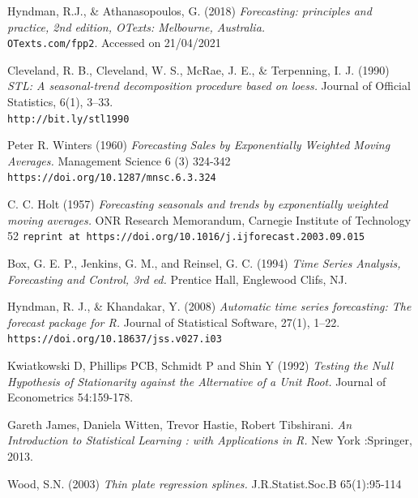 \documentclass[12pt, letterpaper]{article}\usepackage[]{graphicx}\usepackage[]{color}
\begin{document}
\begin{thebibliography}{9}
Hyndman, R.J., \& Athanasopoulos, G. (2018) 
\textit{Forecasting: principles and practice, 2nd edition, OTexts: Melbourne, Australia.} 
\\\texttt{OTexts.com/fpp2}. 
Accessed on 21/04/2021 

Cleveland, R. B., Cleveland, W. S., McRae, J. E., \& Terpenning, I. J. (1990) 
\textit{STL: A seasonal-trend decomposition procedure based on loess.} 
Journal of Official Statistics, 6(1), 3–33. 
\\\texttt{http://bit.ly/stl1990}

Peter R. Winters (1960)
\textit{Forecasting Sales by Exponentially Weighted Moving Averages.} 
Management Science 6 (3) 324-342 
\texttt{https://doi.org/10.1287/mnsc.6.3.324}

C. C. Holt (1957)
\textit{Forecasting seasonals and trends by exponentially weighted moving averages.} 
ONR Research Memorandum, Carnegie Institute of Technology 52 
\texttt{reprint at https://doi.org/10.1016/j.ijforecast.2003.09.015}
 
Box, G. E. P., Jenkins, G. M., and Reinsel, G. C. (1994) 
\textit{Time Series Analysis, Forecasting and Control, 3rd ed.} 
Prentice Hall, Englewood Clifs, NJ.

Hyndman, R. J., \& Khandakar, Y. (2008) 
\textit{Automatic time series forecasting: The forecast package for R.} 
Journal of Statistical Software, 27(1), 1–22. 
\texttt{https://doi.org/10.18637/jss.v027.i03}

Kwiatkowski D, Phillips PCB, Schmidt P and Shin Y (1992) 
\textit{Testing the Null Hypothesis of Stationarity against the Alternative of a Unit Root.} 
Journal of Econometrics 54:159-178.

Gareth James, Daniela Witten, Trevor Hastie, Robert Tibshirani. 
\textit{An Introduction to Statistical Learning : with Applications in R.}
New York :Springer, 2013.

Wood, S.N. (2003) 
\textit{Thin plate regression splines.} 
J.R.Statist.Soc.B 65(1):95-114

\end{thebibliography}
\end{document}
